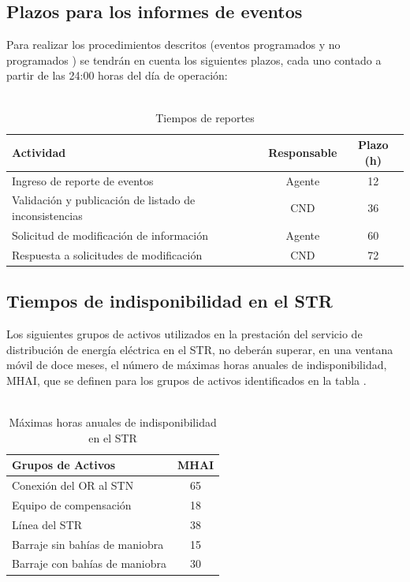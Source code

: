 \documentclass[a5paper]{book}%
\begin{document}
\subsection{Plazos para los informes de eventos}
Para realizar los procedimientos descritos (eventos programados y no programados ) se tendrán en cuenta los siguientes plazos, cada uno contado a partir de las 24:00 horas del día de operación:\\\\


\begin{table}[H]
  \centering
  \caption{Tiempos de reportes}
\begin{tabular}{|p{4cm}|c|c|}
  \hline
Actividad & Responsable&Plazo (h)\\\hline
Ingreso de reporte de eventos &Agente&12\\\hline
Validación y publicación de listado de inconsistencias&
CND&
36\\\hline
Solicitud de modificación de información&
Agente&
60\\\hline
Respuesta a solicitudes de modificación&
CND&
72\\\hline
\end{tabular}
\end{table}

\subsection{Tiempos de indisponibilidad en el STR}

  Los siguientes grupos de activos utilizados en la prestación del servicio de distribución de energía eléctrica en el STR, no deberán superar, en una ventana móvil de doce meses, el número de máximas horas anuales de indisponibilidad, MHAI, que se definen para los grupos de activos identificados en la tabla \cite{CREG0152018}.\\\\


  \begin{table}[H]
    \centering
    \caption{Máximas horas anuales de  indisponibilidad  en el \ac{STR}}
  \begin{tabular}{|p{6cm}|c|}
    \hline
Grupos de Activos&
MHAI\\\hline
Conexión del OR al STN&
65\\\hline
Equipo de compensación&
18\\\hline
Línea del STR&
38\\\hline
Barraje sin bahías de maniobra&
15\\\hline
Barraje con bahías de maniobra&
30\\\hline

  \end{tabular}
\end{table}
\end{document}
